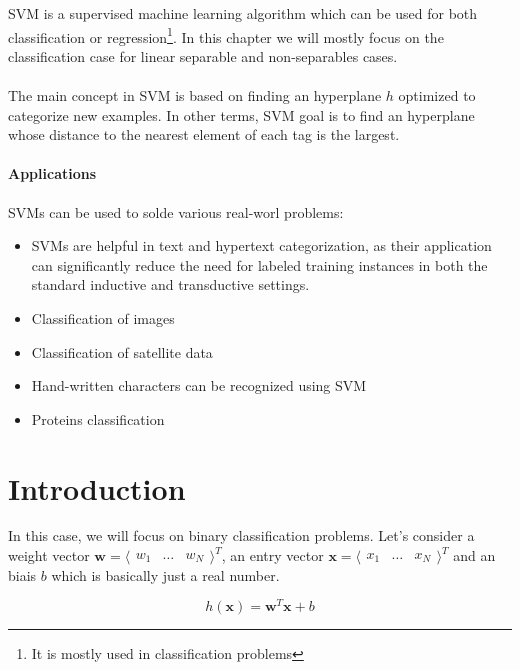 \gls{SVM} is a supervised machine learning algorithm which can be used for both classification or regression\footnote{It is mostly used in classification problems}. In this chapter we will mostly focus on the classification case for linear separable and non-separables cases.

\paragraph{}
The main concept in \gls{SVM} is based on finding an hyperplane $h$ optimized to categorize new examples. In other terms, \gls{SVM} goal is to find an hyperplane whose distance to the nearest element of each tag is the largest.

\paragraph{Applications}
\gls{SVM}s can be used to solde various real-worl problems:
\begin{itemize}
	\item \gls{SVM}s are helpful in text and hypertext categorization, as their application can significantly reduce the need for labeled training instances in both the standard inductive and transductive settings.
	\item Classification of images
	\item Classification of satellite data
	\item Hand-written characters can be recognized using SVM
	\item Proteins classification
\end{itemize}

\section{Introduction}

In this case, we will focus on binary classification problems. Let's consider a weight vector $\mathbf w = \langle \begin{matrix} w_1 & \dots & w_N \end{matrix} \rangle^T$, an entry vector $\mathbf x = \langle \begin{matrix} x_1 & \dots & x_N \end{matrix} \rangle^T$ and an biais $b$ which is basically just a real number.

\begin{equation}
	h(\mathbf x) = \mathbf w^T\mathbf x + b
\end{equation}

